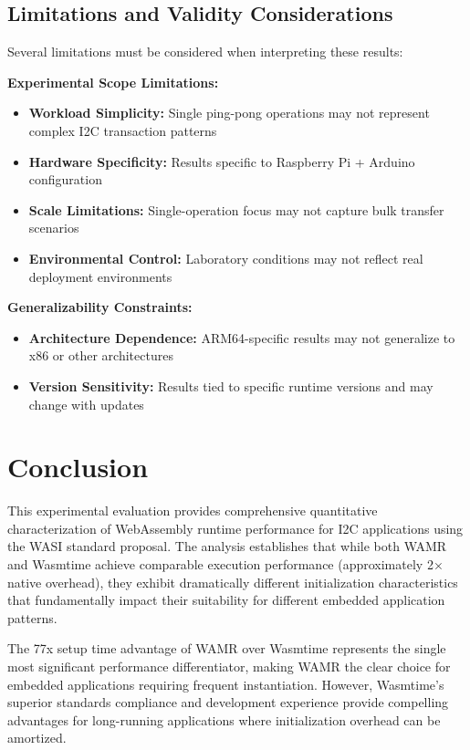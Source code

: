 \subsection{Limitations and Validity Considerations}
\label{subsec:limitations}

Several limitations must be considered when interpreting these results:

\textbf{Experimental Scope Limitations:}
\begin{itemize}
    \item \textbf{Workload Simplicity:} Single ping-pong operations may not represent complex I2C transaction patterns
    \item \textbf{Hardware Specificity:} Results specific to Raspberry Pi + Arduino configuration
    \item \textbf{Scale Limitations:} Single-operation focus may not capture bulk transfer scenarios
    \item \textbf{Environmental Control:} Laboratory conditions may not reflect real deployment environments
\end{itemize}

\textbf{Generalizability Constraints:}
\begin{itemize}
    \item \textbf{Architecture Dependence:} ARM64-specific results may not generalize to x86 or other architectures
    \item \textbf{Version Sensitivity:} Results tied to specific runtime versions and may change with updates
\end{itemize}

\section{Conclusion}
\label{sec:eval-conclusion}

This experimental evaluation provides comprehensive quantitative characterization of WebAssembly runtime performance for I2C applications using the WASI standard proposal. The analysis establishes that while both WAMR and Wasmtime achieve comparable execution performance (approximately 2× native overhead), they exhibit dramatically different initialization characteristics that fundamentally impact their suitability for different embedded application patterns.

The 77x setup time advantage of WAMR over Wasmtime represents the single most significant performance differentiator, making WAMR the clear choice for embedded applications requiring frequent instantiation. However, Wasmtime's superior standards compliance and development experience provide compelling advantages for long-running applications where initialization overhead can be amortized.

